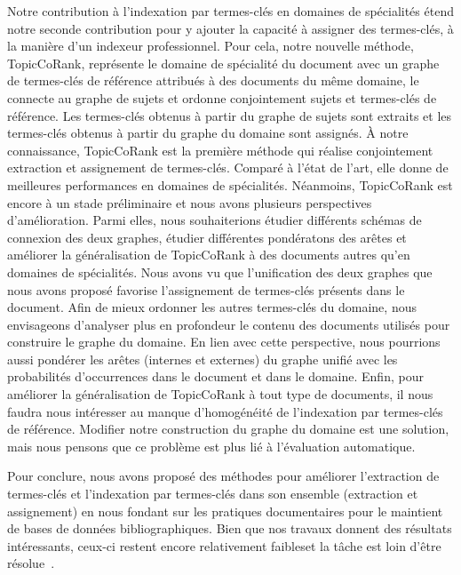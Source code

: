   Notre contribution à l'indexation par termes-clés en domaines de spécialités
  étend notre seconde contribution pour y ajouter la capacité à assigner des
  termes-clés, à la manière d'un indexeur professionnel. Pour cela, notre
  nouvelle méthode, TopicCoRank, représente le domaine de spécialité du document
  avec un graphe de termes-clés de référence attribués à des documents du même
  domaine, le connecte au graphe de sujets et ordonne conjointement sujets et
  termes-clés de référence. Les termes-clés obtenus à partir du graphe de sujets
  sont extraits et les termes-clés obtenus à partir du graphe du domaine sont
  assignés. À notre connaissance, TopicCoRank est la première méthode qui
  réalise conjointement extraction et assignement de termes-clés. Comparé à
  l'état de l'art, elle donne de meilleures performances en domaines de
  spécialités. Néanmoins, TopicCoRank est encore à un stade préliminaire et nous
  avons plusieurs perspectives d'amélioration. Parmi elles, nous souhaiterions
  étudier différents schémas de connexion des deux graphes, étudier différentes
  pondératons des arêtes et améliorer la généralisation de TopicCoRank à des
  documents autres qu'en domaines de spécialités. Nous avons vu que
  l'unification des deux graphes que nous avons proposé favorise l'assignement
  de termes-clés présents dans le document. Afin de mieux ordonner les autres
  termes-clés du domaine, nous envisageons d'analyser plus en profondeur le
  contenu des documents utilisés pour construire le graphe du domaine. En lien
  avec cette perspective, nous pourrions aussi pondérer les arêtes (internes et
  externes) du graphe unifié avec les probabilités d'occurrences dans le
  document et dans le domaine. Enfin, pour améliorer la généralisation de
  TopicCoRank à tout type de documents, il nous faudra nous intéresser au manque
  d'homogénéité de l'indexation par termes-clés de référence. Modifier notre
  construction du graphe du domaine est une solution, mais nous pensons que ce
  problème est plus lié à l'évaluation automatique.

  Pour conclure, nous avons proposé des méthodes pour améliorer l'extraction de
  termes-clés et l'indexation par termes-clés dans son ensemble (extraction et
  assignement) en nous fondant sur les pratiques documentaires pour le maintient
  de bases de données bibliographiques. Bien que nos travaux donnent des
  résultats intéressants, ceux-ci restent encore relativement faibleset
  \og{}la tâche est loin d'être résolue\fg{}~\cite{hasan2014state_of_the_art}.


